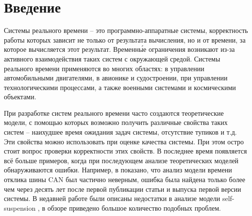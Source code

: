 \documentclass[14pt]{matmex-diploma-custom}
\begin{document}

\maketitle
\tableofcontents

\section*{Введение}

Системы реального времени -- это программно-аппаратные системы, корректность работы которых 
  зависит не только от результата вычисления, но и от времени, за которое вычисляется 
  этот результат. Временны́е ограничения возникают из-за активного взаимодействия таких 
  систем с окружающей средой. Системы реального времени применяются во многих областях: 
  в управлении автомобильными двигателями, в авионике и судостроении, при управлении 
  технологическими процессами, а также военными системами и космическими объектами. 

При разработке систем реального времени часто создаются теоретические модели, с 
  помощью которых возможно получить различные свойства
  таких систем -- наихудшее время ожидания задач системы, отсутствие тупиков и т.д. 
  Эти свойства можно использовать при оценке качества системы. 
  При этом остро стоит вопрос проверки корректности этих свойств.
  В последнее время появляется всё больше примеров, когда при последующем анализе 
  теоретических моделей обнаруживаются ошибки. Например, в \cite{Bril06messageresponse} 
  показано, что анализ модели времени отклика шины CAN \cite{Tindell1994AnEA} 
  был частично неверным, ошибка была найдена только более чем через десять лет после 
  первой публикации статьи и выпуска первой версии системы. В недавней работе \cite{nelissen} 
  были описаны недостатки в анализе модели self-suspension \cite{lakshmanan:1}, 
  в обзоре \cite{chen} приведено большое количество  подобных проблем.
\end{document}
